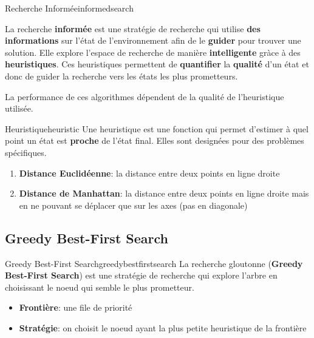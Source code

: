 \begin{definition}{Recherche Informée}{informedsearch}

    La recherche \textbf{informée} est une stratégie de recherche qui utilise \textbf{des informations} sur l'état de l'environnement afin de le \textbf{guider} pour trouver une solution.
    Elle explore l'espace de recherche de manière \textbf{intelligente} gràce à des \textbf{heuristiques}. 
    Ces heuristiques permettent de \textbf{quantifier} la \textbf{qualité} d'un état et donc 
    de guider la recherche vers les états les plus prometteurs.
\end{definition}

\begin{remark}\leavevmode
    La performance de ces algorithmes dépendent de la qualité de l'heuristique utilisée.
\end{remark}

\begin{definition}{Heuristique}{heuristic}
    Une heuristique est une fonction qui permet d'estimer à quel point un état est \textbf{proche}
    de l'état final. Elles sont designées pour des problèmes spécifiques.
\end{definition}

\begin{examples}\leavevmode
    \begin{enumerate}
        \item \textbf{Distance Euclidéenne}: la distance entre deux points 
            en ligne droite 
        \item \textbf{Distance de Manhattan}: la distance entre deux points 
            en ligne droite mais en ne pouvant se déplacer que sur les axes 
            (pas en diagonale) 
    \end{enumerate}
\end{examples}


\subsection{Greedy Best-First Search} %
\label{sub:greedy_best_first_search}

\begin{definition}{Greedy Best-First Search}{greedybestfirstsearch}
    La recherche gloutonne (\textbf{Greedy Best-First Search}) est une stratégie de recherche qui explore l'arbre en choisissant le noeud qui semble le plus prometteur.
    \begin{itemize}
        \item \textbf{Frontière}: une file de priorité
        \item \textbf{Stratégie}: on choisit le noeud ayant la plus petite heuristique de la frontière
    \end{itemize} 
\end{definition}

